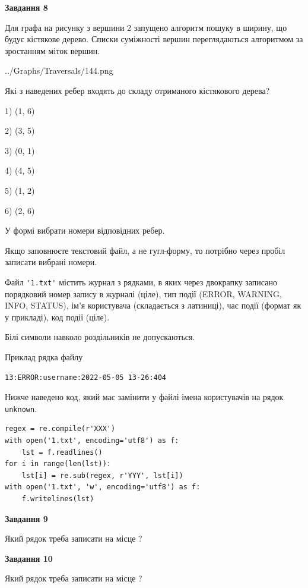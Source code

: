 \documentclass[12pt, ukrainian]{article}
\def\code#1{\Verb!#1!}
\begin{document}
{\begin {large}
{\begin {center}\textbf{Завдання 8}\end {center}}\par
Для графа на рисунку з вершини 2 запущено алгоритм пошуку в ширину, що будує кістякове дерево. Списки суміжності вершин переглядаються алгоритмом за зростанням міток вершин.\par
\begin{center}
	{../Graphs/Traversals/144.png}
\end{center}
\par Які з наведених ребер входять до складу отриманого кістякового дерева?\par
1) (1, 6)\par
2) (3, 5)\par
3) (0, 1)\par
4) (4, 5)\par
5) (1, 2)\par
6) (2, 6)\par
{\vskip 15pt} У формі вибрати номери відповідних ребер.


Якщо заповнюєте текстовий файл, а не гугл-форму, то потрібно через пробіл записа\-ти вибрані номери.\par
\newpage


Файл \code{'1.txt'} містить журнал з рядками, в яких через двокрапку записано поряд\-ко\-вий номер запису в журналі (ціле), тип події (ERROR, WARNING, INFO, STATUS), ім'я користувача (складається з латиниці), час події (фор\-мат як у прикладі), код події (ціле).

Білі символи навколо роздільників не допускаються.

Приклад рядка файлу



\begin{verbatim}
13:ERROR:username:2022-05-05 13-26:404
\end{verbatim}


Нижче наведено код, який має замінити у файлі імена користувачів на рядок \code{unknown}.



\begin{verbatim}
regex = re.compile(r'XXX')
with open('1.txt', encoding='utf8') as f:
    lst = f.readlines()
for i in range(len(lst)):
    lst[i] = re.sub(regex, r'YYY', lst[i])
with open('1.txt', 'w', encoding='utf8') as f:
    f.writelines(lst)
\end{verbatim}




{\begin {center}\textbf{Завдання 9}\end {center}}\par
Який рядок треба записати на місце  ?\par
\vspace{5mm}


{\begin {center}\textbf{Завдання 10}\end {center}}\par
Який рядок треба записати на місце  ?\par


\newpage


\end {large}}
\end{document}

